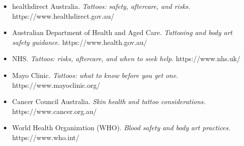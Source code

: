 \begin{itemize}
    \item healthdirect Australia. \textit{Tattoos: safety, aftercare, and risks.} https://www.healthdirect.gov.au/
    \item Australian Department of Health and Aged Care. \textit{Tattooing and body art safety guidance.} https://www.health.gov.au/
    \item NHS. \textit{Tattoos: risks, aftercare, and when to seek help.} https://www.nhs.uk/
    \item Mayo Clinic. \textit{Tattoos: what to know before you get one.} https://www.mayoclinic.org/
    \item Cancer Council Australia. \textit{Skin health and tattoo considerations.} https://www.cancer.org.au/
    \item World Health Organization (WHO). \textit{Blood safety and body art practices.} https://www.who.int/
\end{itemize}

\clearpage

